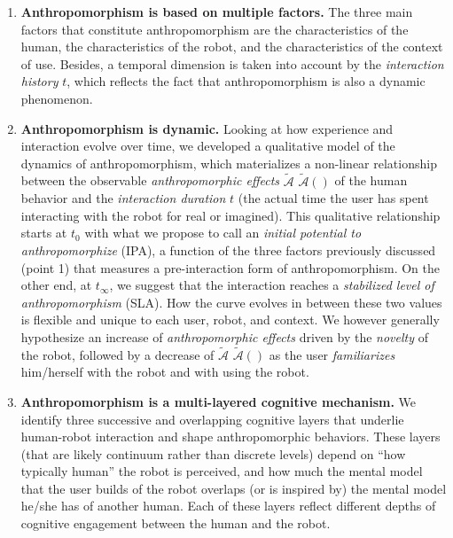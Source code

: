 \documentclass{frontiersSCNS} %
\newcommand{\AntE}[1][]{%
      \ifthenelse{\isempty{#1}}%
      {$\widetilde{\mathcal{A}}$}
      {$\widetilde{\mathcal{A}}(#1)$}
}
\begin{document}
\begin{enumerate}

\item \textbf{Anthropomorphism is based on multiple factors.} The three main
    factors that constitute anthropomorphism are the characteristics of the
    human, the characteristics of the robot, and the characteristics of the
    context of use. Besides, a temporal dimension is taken into account by the
    \textit{interaction history} $t$, which reflects the fact that
    anthropomorphism is also a dynamic phenomenon.

\item \textbf{Anthropomorphism is dynamic.} Looking at how experience and
    interaction evolve over time, we developed a qualitative model of the
    dynamics of anthropomorphism, which materializes a non-linear relationship
    between the observable \textit{anthropomorphic effects} \AntE of the human
    behavior and the \textit{interaction duration} $t$ (the actual time the user
    has spent interacting with the robot for real or imagined). This qualitative
    relationship starts at $t_{0}$ with what we propose to call an \textit{initial potential to
    anthropomorphize} (IPA), a function of the three factors previously
    discussed (point 1) that measures a pre-interaction form of
    anthropomorphism. On the other end, at $t_{\infty}$, we suggest that the
    interaction reaches a \textit{stabilized level of anthropomorphism} (SLA).
    How the curve evolves in between these two values is flexible and unique to
    each user, robot, and context. We however generally hypothesize an increase of
    \textit{anthropomorphic effects} driven by the \textit{novelty} of the
    robot, followed by a decrease of \AntE as the user \textit{familiarizes}
    him/herself with the robot and with using the robot. 

\item \textbf{Anthropomorphism is a multi-layered cognitive mechanism.} We 
    identify three successive and overlapping cognitive layers that underlie
    human-robot interaction and shape anthropomorphic behaviors.
    These layers (that are likely continuum rather than discrete levels) depend
    on ``how typically human'' the robot is perceived, and how much the mental
    model that the user builds of the robot overlaps (or is inspired by) the
    mental model he/she has of another human. Each of these layers
    reflect different depths of cognitive engagement between the human and the
    robot.

\end{enumerate}
\end{document}
